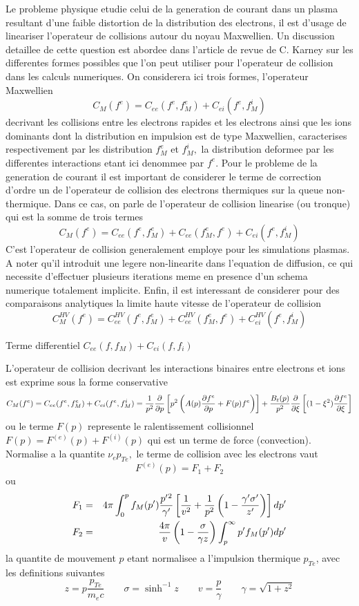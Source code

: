 Le probleme physique etudie celui de la generation de courant dans un plasma
resultant d'une faible distortion de la distribution des electrons, il est
d'usage de lineariser l'operateur de collisions autour du noyau Maxwellien.
Un discussion detaillee de cette question est abordee dans l'article de
revue de C. Karney sur les differentes formes possibles que l'on peut
utiliser pour l'operateur de collision dans les calculs numeriques. On
considerera ici trois formes, l'operateur Maxwellien 
\[
C_{M}(f^{e})=C_{ee}(f^{e},f_{M}^{e})+C_{ei}(f^{e},f_{M}^{i})
\]
decrivant les collisions entre les electrons rapides et les electrons ainsi
que les ions dominants dont la distribution en impulsion est de type
Maxwellien, caracterises respectivement par les distribution $f_{M}^{e}$ et $%
f_{M}^{i},$ la distribution deformee par les differentes interactions etant
ici denommee par $f^{e}.$ Pour le probleme de la generation de courant il
est important de considerer le terme de correction d'ordre un de l'operateur
de collision des electrons thermiques sur la queue non-thermique. Dans ce
cas, on parle de l'operateur de collision linearise (ou tronque) qui est la
somme de trois termes 
\[
C_{M}(f^{e})=C_{ee}(f^{e},f_{M}^{e})+C_{ee}(f_{M}^{e},f^{e})+C_{ei}(f^{e},f_{M}^{i})
\]
C'est l'operateur de collision generalement employe pour les simulations
plasmas. A noter qu'il introduit une legere non-linearite dans l'equation de
diffusion, ce qui necessite d'effectuer plusieurs iterations meme en
presence d'un schema numerique totalement implicite. Enfin, il est
interessant de considerer pour des comparaisons analytiques la limite haute
vitesse de l'operateur de collision 
\[
C_{M}^{HV}(f^{e})=C_{ee}^{HV}(f^{e},f_{M}^{e})+C_{ee}^{HV}(f_{M}^{e},f^{e})+C_{ei}^{HV}(f^{e},f_{M}^{i})
\]

Terme differentiel $C_{ee}(f,f_{M})+C_{ei}(f,f_{i})$

L'operateur de collision decrivant les interactions binaires entre electrons
et ions est exprime sous la forme conservative 
\[
C_{M}(f^{e})=C_{ee}(f^{e},f_{M}^{e})+C_{ei}(f^{e},f_{M}^{i})=\frac{1}{p^{2}}%
\frac{\partial }{\partial p}\left[ p^{2}\left( A(p)\frac{\partial f^{e}}{%
\partial p}+F(p)f^{e}\right) \right] +\frac{B_{t}(p)}{p^{2}}\frac{\partial }{%
\partial \xi }\left[ (1-\xi ^{2})\frac{\partial f^{e}}{\partial \xi }\right] 
\]
ou le terme $F(p)$ represente le ralentissement collisionnel $
F(p)=F^{(e)}(p)+F^{(i)}(p)$ qui est un terme de force (convection).
Normalise a la quantite $\nu _{e}p_{Te},$ le terme de collision avec les
electrons vaut 
\[
F^{(e)}(p)=F_{1}+F_{2}
\]
ou
\begin{eqnarray*}
F_{1} &=&4\pi \int_{0}^{p}f_{M}(p^{\prime })\frac{p^{\prime }{}^{2}}{\gamma
^{\prime }}\left[ \frac{1}{v^{2}}+\frac{1}{p^{2}}\left( 1-\frac{\gamma
^{\prime }\sigma ^{\prime }}{z^{\prime }}\right) \right] dp^{\prime } \\
F_{2} &=&\frac{4\pi }{v}\left( 1-\frac{\sigma }{\gamma z}\right) \int_{p}^{%
\infty }p^{\prime }f_{M}(p^{\prime })dp^{\prime }
\end{eqnarray*}
la quantite de mouvement $p$ etant normalisee a l'impulsion thermique $p_{Te}
$, avec les definitions suivantes 
\[
z=p\frac{p_{Te}}{m_{e}c}\qquad \sigma =\sinh ^{-1}z\qquad v=\frac{p}{\gamma }
\qquad \gamma =\sqrt{1+z^{2}}
\]

